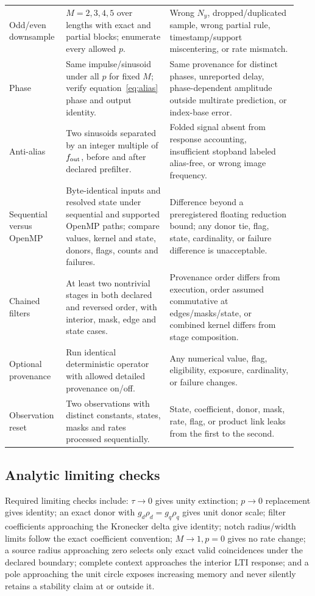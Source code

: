 \documentclass[11pt]{article}
\begin{document}
\begin{longtable}{@{}p{0.18\linewidth}p{0.34\linewidth}p{0.42\linewidth}@{}}
Odd/even downsample & $M=2,3,4,5$ over lengths with exact and partial blocks; enumerate every allowed $p$. & Wrong $N_y$, dropped/duplicated sample, wrong partial rule, timestamp/support miscentering, or rate mismatch. \\
Phase & Same impulse/sinusoid under all $p$ for fixed $M$; verify equation~\eqref{eq:alias} phase and output identity. & Same provenance for distinct phases, unreported delay, phase-dependent amplitude outside multirate prediction, or index-base error. \\
Anti-alias & Two sinusoids separated by an integer multiple of $f_{\rm out}$, before and after declared prefilter. & Folded signal absent from response accounting, insufficient stopband labeled alias-free, or wrong image frequency. \\
Sequential versus OpenMP & Byte-identical inputs and resolved state under sequential and supported OpenMP paths; compare values, kernel and state, donors, flags, counts and failures. & Difference beyond a preregistered floating reduction bound; any donor tie, flag, state, cardinality, or failure difference is unacceptable. \\
Chained filters & At least two nontrivial stages in both declared and reversed order, with interior, mask, edge and state cases. & Provenance order differs from execution, order assumed commutative at edges/masks/state, or combined kernel differs from stage composition. \\
Optional provenance & Run identical deterministic operator with allowed detailed provenance on/off. & Any numerical value, flag, eligibility, exposure, cardinality, or failure changes. \\
Observation reset & Two observations with distinct constants, states, masks and rates processed sequentially. & State, coefficient, donor, mask, rate, flag, or product link leaks from the first to the second. \\
\bottomrule
\end{longtable}

\subsection{Analytic limiting checks}

Required limiting checks include: $\tau\rightarrow0$ gives unity extinction;
$p\rightarrow0$ replacement gives identity; an exact donor with
$g_d\rho_d=g_q\rho_q$ gives unit donor scale; filter coefficients approaching
the Kronecker delta give identity; notch radius/width limits follow the exact
coefficient convention; $M\rightarrow1,p=0$ gives no rate change; a source
radius approaching zero selects only exact valid coincidences under the
declared boundary; complete context approaches the interior LTI response; and
a pole approaching the unit circle exposes increasing memory and never
silently retains a stability claim at or outside it.
\end{document}

